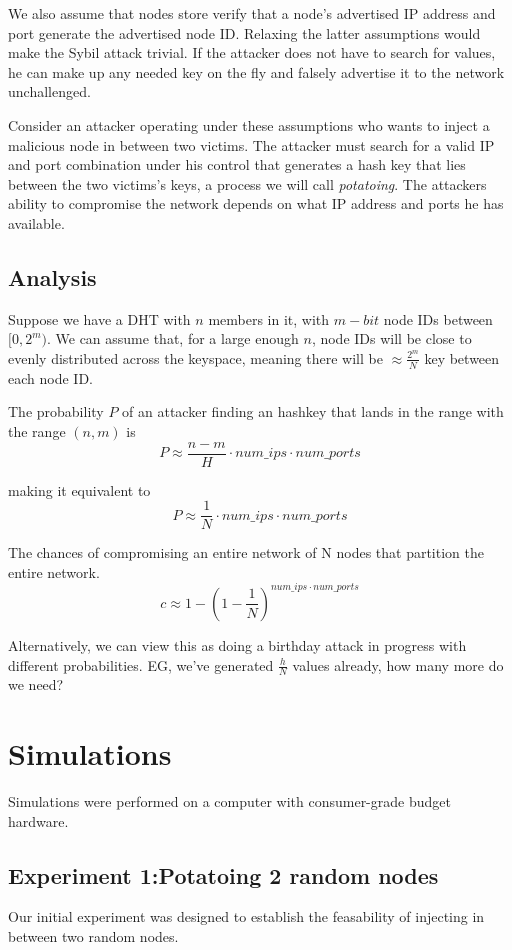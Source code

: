 \documentclass[10pt,a4paper]{article}
\begin{document}
We also assume that nodes store verify that a node's advertised IP address and port generate the advertised node ID. 
Relaxing the latter assumptions would  make the Sybil attack trivial. If the attacker does not have to search for values, he can make up any needed key on the fly and falsely advertise it to the network unchallenged.

Consider an attacker operating under these assumptions who wants to inject a malicious node in between two victims.
The attacker must search for a valid IP and port combination under his control that generates a hash key that lies between the two victims's keys, a process we will call \textit{potatoing}.
The attackers ability to compromise the network depends on what IP address and ports he has available.



\subsection{Analysis}

Suppose we have a DHT with $n$ members in it, with $m-bit$ node IDs between $[0,2^{m})$.
We can assume that, for a large enough $n$, node IDs will be close to evenly distributed across the keyspace, meaning there will be $\approx \frac{2^{m}}{N}$ key between each node ID.

The probability $P$ of an attacker finding an hashkey that lands in the range with the range $(n,m)$ is 
$$ P \approx \frac{n-m}{H}\cdot num\_ips \cdot num\_ports  $$

making it equivalent to
$$ P \approx \frac{1}{N}\cdot num\_ips \cdot num\_ports  $$


The chances of compromising an entire network of N nodes that partition the entire network.
$$c \approx  1 - (1 -\frac{1}{N})^{num\_ips \cdot num\_ports}  $$

Alternatively, we can view this as doing a birthday attack in progress with different probabilities.
EG, we've generated $\frac{h}{N}$ values already, how many more do we need?


\section{Simulations}
Simulations were performed on a computer with consumer-grade budget hardware. 


\subsection{Experiment 1:Potatoing 2 random nodes}
Our initial experiment was designed to establish the feasability of injecting in between two random nodes.
\end{document}
